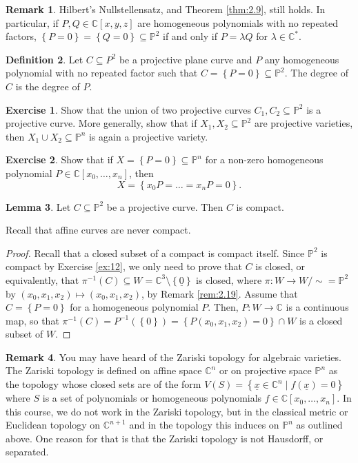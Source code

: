 \documentclass{article}
\newcommand{\C}{\mathbb{C}}
\renewcommand{\P}{\mathbb{P}}
\newcommand{\rb}[1]{\left( #1 \right)}
\renewcommand{\sb}[1]{\left[ #1 \right]}
\newcommand{\cb}[1]{\left\{ #1 \right\}}
\theoremstyle{definition}\newtheorem{definition}{Definition}[section]
\theoremstyle{definition}\newtheorem{notation}[definition]{Notation}
\theoremstyle{definition}\newtheorem{remark}[definition]{Remark}
\theoremstyle{definition}\newtheorem{example}[definition]{Example}
\theoremstyle{definition}\newtheorem{fact}{Fact}
\theoremstyle{definition}\newtheorem{exercise}{Exercise}
\newtheorem{lemma}[definition]{Lemma}
\begin{document}
\begin{remark}
Hilbert's Nullstellensatz, and Theorem \ref{thm:2.9}, still holds. In particular, if $ P, Q \in \C\sb{x, y, z} $ are homogeneous polynomials with no repeated factors, $ \cb{P = 0} = \cb{Q = 0} \subseteq \P^2 $ if and only if $ P = \lambda Q $ for $ \lambda \in \C^* $.
\end{remark}

\begin{definition}
Let $ C \subseteq P^2 $ be a projective plane curve and $ P $ any homogeneous polynomial with no repeated factor such that $ C = \cb{P = 0} \subseteq \P^2 $. The degree of $ C $ is the degree of $ P $.
\end{definition}

\begin{exercise}
Show that the union of two projective curves $ C_1, C_2 \subseteq \P^2 $ is a projective curve. More generally, show that if $ X_1, X_2 \subseteq \P^2 $ are projective varieties, then $ X_1 \cup X_2 \subseteq \P^n $ is again a projective variety.
\end{exercise}

\begin{exercise}
Show that if $ X = \cb{P = 0} \subseteq \P^n $ for a non-zero homogeneous polynomial $ P \in \C\sb{x_0, \dots, x_n} $, then
$$ X = \cb{x_0P = \dots = x_nP = 0}. $$
\end{exercise}

\begin{lemma}
Let $ C \subseteq \P^2 $ be a projective curve. Then $ C $ is compact.
\end{lemma}

Recall that affine curves are never compact.

\begin{proof}
Recall that a closed subset of a compact is compact itself. Since $ \P^2 $ is compact by Exercise \ref{ex:12}, we only need to prove that $ C $ is closed, or equivalently, that $ \pi^{-1}\rb{C} \subseteq W = \C^3 \setminus \cb{\underline{0}} $ is closed, where $ \pi : W \to W / \sim = \P^2 $ by $ \rb{x_0, x_1, x_2} \mapsto \rb{x_0, x_1, x_2} $, by Remark \ref{rem:2.19}. Assume that $ C = \cb{P = 0} $ for a homogeneous polynomial $ P $. Then, $ P : W \to \C $ is a continuous map, so that $ \pi^{-1}\rb{C} = P^{-1}\rb{\cb{0}} = \cb{P\rb{x_0, x_1, x_2} = 0} \cap W $ is a closed subset of $ W $.
\end{proof}

\begin{remark}
You may have heard of the Zariski topology for algebraic varieties. The Zariski topology is defined on affine space $ \C^n $ or on projective space $ \P^n $ as the topology whose closed sets are of the form $ V\rb{S} = \cb{\underline{x} \in \C^n \mid f\rb{\underline{x}} = 0} $ where $ S $ is a set of polynomials or homogeneous polynomials $ f \in \C\sb{x_0, \dots, x_n} $. In this course, we do not work in the Zariski topology, but in the classical metric or Euclidean topology on $ \C^{n + 1} $ and in the topology this induces on $ \P^n $ as outlined above. One reason for that is that the Zariski topology is not Hausdorff, or separated.
\end{remark}
\end{document}
